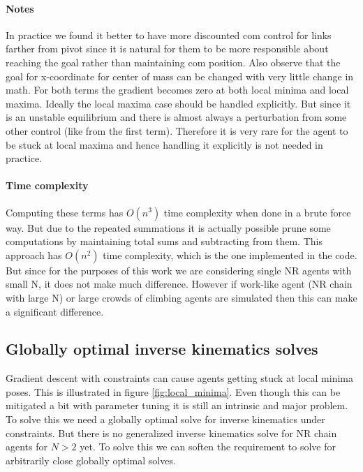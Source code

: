 \documentclass[12pt]{article}
\begin{document}
\paragraph{Notes}
In practice we found it better to have more discounted com control for links farther from pivot since it is natural for them to be more responsible about reaching the goal rather than maintaining com position.
Also observe that the goal for x-coordinate for center of mass can be changed with very little change in math.
For both terms the gradient becomes zero at both local minima and local maxima.
Ideally the local maxima case should be handled explicitly.
But since it is an unstable equilibrium and there is almost always a perturbation from some other control (like from the first term).
Therefore it is very rare for the agent to be stuck at local maxima and hence handling it explicitly is not needed in practice.
\paragraph{Time complexity}
Computing these terms has $O(n^3)$ time complexity when done in a brute force way.
But due to the repeated summations it is actually possible prune some computations by maintaining total sums and subtracting from them.
This approach has $O(n^2)$ time complexity, which is the one implemented in the code.
But since for the purposes of this work we are considering single NR agents with small N, it does not make much difference.
However if work-like agent (NR chain with large N) or large crowds of climbing agents are simulated then this can make a significant difference.

\subsection{Globally optimal inverse kinematics solves}
Gradient descent with constraints can cause agents getting stuck at local minima poses.
This is illustrated in figure \ref{fig:local_minima}.
Even though this can be mitigated a bit with parameter tuning it is still an intrinsic and major problem.
To solve this we need a globally optimal solve for inverse kinematics under constraints.
But there is no generalized inverse kinematics solve for NR chain agents for $N > 2$ yet.
To solve this we can soften the requirement to solve for arbitrarily close globally optimal solves.
\end{document}
